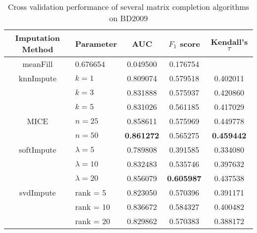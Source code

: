 \begin{table}[htbp]
\centering
\begin{tabular}{cl||ccc}
\toprule
Imputation Method & Parameter & AUC & $F_1$ score & Kendall's $\tau$ \\
\midrule 
meanFill &  0.676654 &  0.049500 &  0.176754 \\
\midrule
knnImpute & $k = 1$ &  0.809074 &  0.579518 &  0.402011 \\
  & $k = 3$  &  0.831888 &  0.575937 &  0.420860 \\
  & $k = 5$ &  0.831026 &  0.561185 &  0.417029 \\
\midrule
MICE & $n = 25$  &  0.858611 &  0.575969 &  0.449778 \\
     & $n = 50$  &  {\bf 0.861272} &  0.565275 &  {\bf 0.459442} \\
\midrule
softImpute & $\lambda=5$ &  0.789808 &  0.391585 &  0.334080 \\
& $\lambda=10$ &  0.832483 &  0.535746 &  0.397632 \\
& $\lambda=20$ &  0.856079 &  {\bf 0.605987} &  0.437538 \\
             
\midrule
svdImpute & rank = 5  &  0.823050 &  0.570396 &  0.391171 \\
& rank = 10  &  0.836672 &  0.584327 &  0.400482 \\
& rank = 20  &  0.829862 &  0.570383 &  0.388172 \\
\bottomrule[1.25pt]
\end{tabular}
\begin{center}
\caption{Cross validation performance of several matrix completion algorithms on BD2009} \label{tab:imputation}
\end{center}
\end{table}

